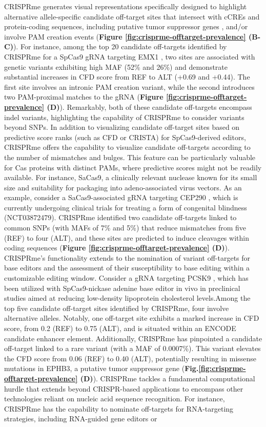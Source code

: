 \documentclass[a4paper, titlepage, openright]{book}
\newcommand{\crisprme}{CRISPRme\xspace}
\begin{document}
%
\crisprme generates visual representations specifically designed to highlight alternative allele-specific candidate off-target sites that intersect with cCREs and protein-coding sequences, including putative tumor suppressor genes \citep{zhao2016tsgene}, and/or involve PAM creation events (\textbf{Figure \ref{fig:crisprme-offtarget-prevalence} (B-C)}). For instance, among the top 20 candidate off-targets identified by \crisprme for a SpCas9 gRNA targeting EMX1 \citep{tsai2015guide}, two sites are associated with genetic variants exhibiting high MAF (52\% and 26\%) and demonstrate substantial increases in CFD score from REF to ALT (+0.69 and +0.44). The first site involves an intronic PAM creation variant, while the second introduces two PAM-proximal matches to the gRNA (\textbf{Figure \ref{fig:crisprme-offtarget-prevalence} (D)}). Remarkably, both of these candidate off-targets encompass indel variants, highlighting the capability of CRISPRme to consider variants beyond SNPs. In addition to visualizing candidate off-target sites based on predictive score ranks (such as CFD or CRISTA) for SpCas9-derived editors, CRISPRme offers the capability to visualize candidate off-targets according to the number of mismatches and bulges. This feature can be particularly valuable for Cas proteins with distinct PAMs, where predictive scores might not be readily available. For instance, SaCas9, a clinically relevant nuclease known for its small size and suitability for packaging into adeno-associated virus vectors. As an example, consider a SaCas9-associated gRNA targeting CEP290 \citep{maeder2019development}, which is currently undergoing clinical trials for treating a form of congenital blindness (NCT03872479). \crisprme identified two candidate off-targets linked to common SNPs (with MAFs of 7\% and 5\%) that reduce mismatches from five (REF) to four (ALT), and these sites are predicted to induce cleavages within coding sequences (\textbf{Figure \ref{fig:crisprme-offtarget-prevalence} (D)}). \crisprme's functionality extends to the nomination of variant off-targets for base editors and the assessment of their susceptibility to base editing within a customizable editing window. Consider a gRNA targeting PCSK9 \citep{musunuru2021vivo}, which has been utilized with SpCas9-nickase adenine base editor in vivo in preclinical studies aimed at reducing low-density lipoprotein cholesterol levels.Among the top five candidate off-target sites identified by \crisprme, four involve alternative alleles. Notably, one off-target site exhibits a marked increase in CFD score, from 0.2 (REF) to 0.75 (ALT), and is situated within an ENCODE candidate enhancer element. Additionally, \crisprme has pinpointed a candidate off-target linked to a rare variant (with a MAF of 0.0007\%). This variant elevates the CFD score from 0.06 (REF) to 0.40 (ALT), potentially resulting in missense mutations in EPHB3, a putative tumor suppressor gene (\textbf{Fig.\ref{fig:crisprme-offtarget-prevalence} (D)}). \crisprme tackles a fundamental computational hurdle that extends beyond CRISPR-based applications to encompass other technologies reliant on nucleic acid sequence recognition. For instance, CRISPRme has the capability to nominate off-targets for RNA-targeting strategies, including RNA-guided gene editors or 
\end{document}
